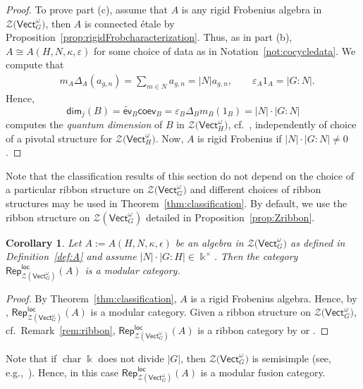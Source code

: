 \documentclass[pdftex]{sigma}
\numberwithin{equation}{section}
\newtheorem{Corollary}[Theorem]{Corollary}
\newcommand{\cha}{\operatorname{char}}
\newcommand{\coev}{\mathsf{coev}}
\newcommand{\evr}{\widetilde{\mathsf{ev}}}
\renewcommand{\dim}{\mathsf{dim}}
\newcommand{\locmod}{\mathsf{Rep}^{\mathsf{loc}}}
\newcommand{\Vect}{\mathsf{Vect}}
\newcommand{\cZ}{\mathcal{Z}}
\begin{document}
\begin{proof}
To prove part (c), assume that $A$ is any rigid Frobenius algebra in $\cZ\big(\Vect_G^\omega\big)$, then $A$ is connected \'etale by Proposition~\ref{prop:rigidFrobcharacterization}. Thus, as in part (b), $A\cong A(H,N,\kappa, \varepsilon)$ for some choice of data as in Notation~\ref{not:cocycledata}.
We compute that
\begin{align*}
& m_A\Delta_A(a_{g,n})=\sum_{m\in N}a_{g,n}=|N| a_{g,n},\qquad
 \varepsilon_A 1_A = |G : N|.
\end{align*}
Hence,
\[\dim_j(B)=\evr_B \coev_B=\varepsilon_B\Delta_Bm_B(1_B)=|N|\cdot |G : N|\]
computes the \emph{quantum dimension} of $B$ in $\cZ\big(\Vect_H^\omega\big)$, cf.\ \cite[equation (3.7)]{LW3}, independently of choice of a pivotal structure for $\cZ\big(\Vect_H^\omega\big)$. Now, $A$ is rigid Frobenius if $|N|\cdot |G : N|\neq 0$.
\end{proof}

\begin{Remark}\label{rem:ribbon}
Note that the classification results of this section do not depend on the choice of a particular ribbon structure on $\cZ\big(\Vect_G^\omega\big)$ and different choices of ribbon structures may be used in Theorem~\ref{thm:classification}. By default, we use the ribbon structure on $\cZ(\Vect_{G}^\omega)$ detailed in Proposition~\ref{prop:Zribbon}.
\end{Remark}

\begin{Corollary}\label{cor:modular}
Let $A:=A(H,N,\kappa,\epsilon)$ be an algebra in $\cZ\big(\Vect_G^\omega\big)$ as defined in Definition~{\rm \ref{def:A}} and assume $|N|\cdot |G:H|\in \Bbbk^\times$.
Then the category $\locmod_{\cZ(\Vect_{G}^\omega)}(A)$ is a modular category.
\end{Corollary}
\begin{proof}
By Theorem~\ref{thm:classification}, $A$ is a rigid Frobenius algebra. Hence, by \cite[Theorem 4.12]{LW3}, $\locmod_{\cZ(\Vect_{G}^\omega)}(A)$ is a modular category. Given a ribbon structure on $\cZ\big(\Vect_G^\omega\big)$, cf.\ Remark~\ref{rem:ribbon}, $\locmod_{\cZ(\Vect_{G}^\omega)}(A)$ is a ribbon category by \cite[1.17.~Theorem]{KO} or \cite[Proposition~4.18]{LW3}.
\end{proof}

Note that if $\cha \Bbbk$ does not divide $|G|$, then $\cZ\big(\Vect_G^\omega\big)$ is semisimple (see, e.g.,~\cite[Corollary~13.2.3]{Rad}). Hence, in this case $\locmod_{\cZ(\Vect_{G}^\omega)}(A)$ is a modular fusion category.
\end{document}
